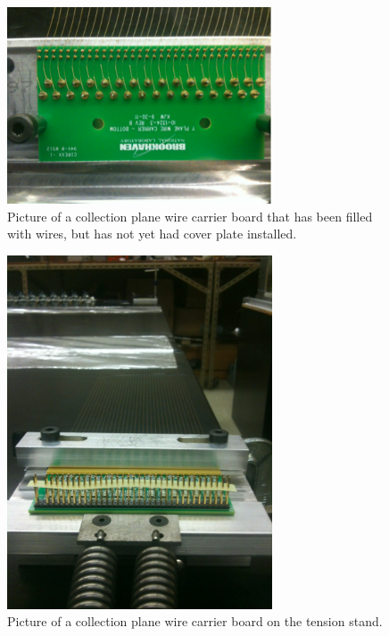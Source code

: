 \begin{figure}[htb]
\centering
\includegraphics[angle =0,width=0.7\textwidth]{figures/wire-carrierboard.png}
\caption{Picture of a collection plane wire carrier board that has been filled with wires, but has not yet had cover plate installed.}
\label{fig:carrier-boards}
\end{figure}


\begin{figure}[htb]
\centering
\includegraphics[angle=0,width=0.7\textwidth]{figures/wire-boardtension.png}
\caption{Picture of a collection plane wire carrier board on the tension stand.}
\label{fig:stress-stand}
\end{figure}



